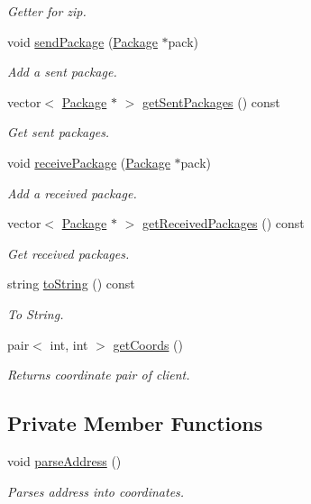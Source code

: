 \begin{DoxyCompactItemize}
\begin{DoxyCompactList}\small\item\em Getter for zip. \end{DoxyCompactList}\item 
void \hyperlink{classClient_a2127f6355c6d4fe400f3dd314e1fabc8}{send\+Package} (\hyperlink{classPackage}{Package} $\ast$pack)
\begin{DoxyCompactList}\small\item\em Add a sent package. \end{DoxyCompactList}\item 
vector$<$ \hyperlink{classPackage}{Package} $\ast$ $>$ \hyperlink{classClient_aff47cd6d18feba4c43f7ff495d73f495}{get\+Sent\+Packages} () const 
\begin{DoxyCompactList}\small\item\em Get sent packages. \end{DoxyCompactList}\item 
void \hyperlink{classClient_a1726c784a1c19701a13e12333cf906e5}{receive\+Package} (\hyperlink{classPackage}{Package} $\ast$pack)
\begin{DoxyCompactList}\small\item\em Add a received package. \end{DoxyCompactList}\item 
vector$<$ \hyperlink{classPackage}{Package} $\ast$ $>$ \hyperlink{classClient_aae2dee02f0951f418941234103c275ef}{get\+Received\+Packages} () const 
\begin{DoxyCompactList}\small\item\em Get received packages. \end{DoxyCompactList}\item 
string \hyperlink{classClient_a994ff91075daf477725ca055874e3e22}{to\+String} () const 
\begin{DoxyCompactList}\small\item\em To String. \end{DoxyCompactList}\item 
pair$<$ int, int $>$ \hyperlink{classClient_a00ea13c3af8a5eb6d931e73a5a00bdd4}{get\+Coords} ()
\begin{DoxyCompactList}\small\item\em Returns coordinate pair of client. \end{DoxyCompactList}\end{DoxyCompactItemize}
\subsection*{Private Member Functions}
\begin{DoxyCompactItemize}
\item 
void \hyperlink{classClient_a6953fb1cd2e5a4fa87ee08479072a402}{parse\+Address} ()
\begin{DoxyCompactList}\small\item\em Parses address into coordinates. \end{DoxyCompactList}\end{DoxyCompactItemize}
